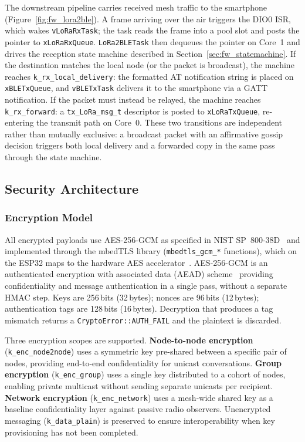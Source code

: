 \documentclass[english,bachelor]{tfgitic}[2026/01/22]
\begin{document}
The downstream pipeline carries received mesh traffic to the smartphone
(Figure~\ref{fig:fw_lora2ble}). A frame arriving over the air triggers the DIO0 ISR,
which wakes \texttt{vLoRaRxTask}; the task reads the frame into a pool slot and posts
the pointer to \texttt{xLoRaRxQueue}. \texttt{LoRa2BLETask} then dequeues the pointer on
Core~1 and drives the reception state machine described in
Section~\ref{sec:fw_statemachine}. If the destination matches the local node (or the
packet is broadcast), the machine reaches \texttt{k\_rx\_local\_delivery}: the formatted
AT notification string is placed on \texttt{xBLETxQueue}, and \texttt{vBLETxTask}
delivers it to the smartphone via a GATT notification. If the packet must instead be
relayed, the machine reaches \texttt{k\_rx\_forward}: a \texttt{tx\_LoRa\_msg\_t}
descriptor is posted to \texttt{xLoRaTxQueue}, re-entering the transmit path on
Core~0. These two transitions are independent rather than mutually exclusive: a
broadcast packet with an affirmative gossip decision triggers both local delivery and a
forwarded copy in the same pass through the state machine.



\subsection{Security Architecture}
\label{sec:fw_security}

\subsubsection{Encryption Model}
\label{sec:fw_crypto}

All encrypted payloads use AES-256-GCM as specified in NIST SP~800-38D~\cite{nist2007gcm}
and implemented through the mbedTLS library (\texttt{mbedtls\_gcm\_*} functions),
which on the ESP32 maps to the hardware AES
accelerator~\cite{espressif2023esp32trm}. AES-256-GCM is an authenticated encryption
with associated data (AEAD) scheme~\cite{rfc5116} providing confidentiality and
message authentication in a single pass, without a separate HMAC step. Keys are
256\,bits (32\,bytes); nonces are 96\,bits (12\,bytes); authentication tags are
128\,bits (16\,bytes). Decryption that produces a tag mismatch returns a
\texttt{CryptoError::AUTH\_FAIL} and the plaintext is discarded.

Three encryption scopes are supported. \textbf{Node-to-node encryption}
(\texttt{k\_enc\_node2node}) uses a symmetric key pre-shared between a specific pair
of nodes, providing end-to-end confidentiality for unicast conversations.
\textbf{Group encryption} (\texttt{k\_enc\_group}) uses a single key distributed
to a cohort of nodes, enabling private multicast without sending separate unicasts
per recipient. \textbf{Network encryption} (\texttt{k\_enc\_network}) uses a
mesh-wide shared key as a baseline confidentiality layer against passive
radio observers. Unencrypted messaging (\texttt{k\_data\_plain}) is preserved to
ensure interoperability when key provisioning has not been completed.
\end{document}
